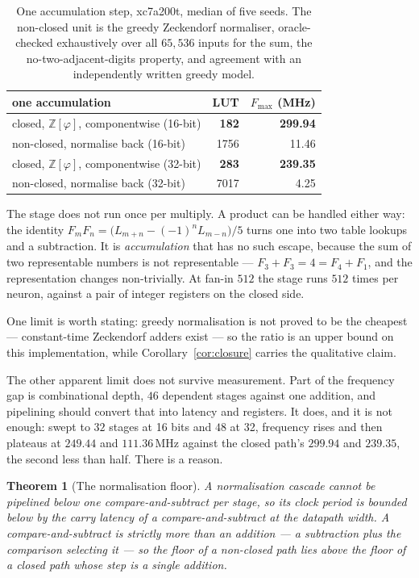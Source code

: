 \documentclass[11pt]{article}
\newtheorem{theorem}{Theorem}
\theoremstyle{definition}
\begin{document}
\begin{table}[t]\centering
\caption{One accumulation step, xc7a200t, median of five seeds. The non-closed
unit is the greedy Zeckendorf normaliser, oracle-checked exhaustively over all
$65{,}536$ inputs for the sum, the no-two-adjacent-digits property, and
agreement with an independently written greedy model.}
\label{tab:closure}
\begin{tabular}{lrr}
\toprule
one accumulation & LUT & $F_{\max}$ (MHz) \\
\midrule
closed, $\mathbb{Z}[\varphi]$, componentwise (16-bit) & \textbf{182} & \textbf{299.94} \\
non-closed, normalise back (16-bit)                   & 1756 & 11.46 \\
\addlinespace
closed, $\mathbb{Z}[\varphi]$, componentwise (32-bit) & \textbf{283} & \textbf{239.35} \\
non-closed, normalise back (32-bit)                   & 7017 & 4.25 \\
\bottomrule
\end{tabular}
\end{table}

The stage does not run once per multiply. A product can be handled either way:
the identity $F_mF_n = \bigl(L_{m+n}-(-1)^nL_{m-n}\bigr)/5$ turns one into two
table lookups and a subtraction. It is \emph{accumulation} that has no such
escape, because the sum of two representable numbers is not representable ---
$F_3+F_3 = 4 = F_4+F_1$, and the representation changes non-trivially. At fan-in
$512$ the stage runs $512$ times per neuron, against a pair of integer registers
on the closed side.

One limit is worth stating: greedy normalisation is not proved to be the
cheapest --- constant-time Zeckendorf adders exist --- so the ratio is an upper
bound on this implementation, while Corollary~\ref{cor:closure} carries the
qualitative claim.

The other apparent limit does not survive measurement. Part of the frequency gap
is combinational depth, $46$ dependent stages against one addition, and
pipelining should convert that into latency and registers. It does, and it is
not enough: swept to $32$ stages at 16 bits and $48$ at 32, frequency rises and
then plateaus at $249.44$ and $111.36$\,MHz against the closed path's $299.94$
and $239.35$, the second less than half. There is a reason.

\begin{theorem}[The normalisation floor]\label{thm:normfloor}
A normalisation cascade cannot be pipelined below one compare-and-subtract per
stage, so its clock period is bounded below by the carry latency of a
compare-and-subtract at the datapath width. A compare-and-subtract is strictly
more than an addition --- a subtraction plus the comparison selecting it --- so
the floor of a non-closed path lies above the floor of a closed path whose step
is a single addition.
\end{theorem}
\end{document}
